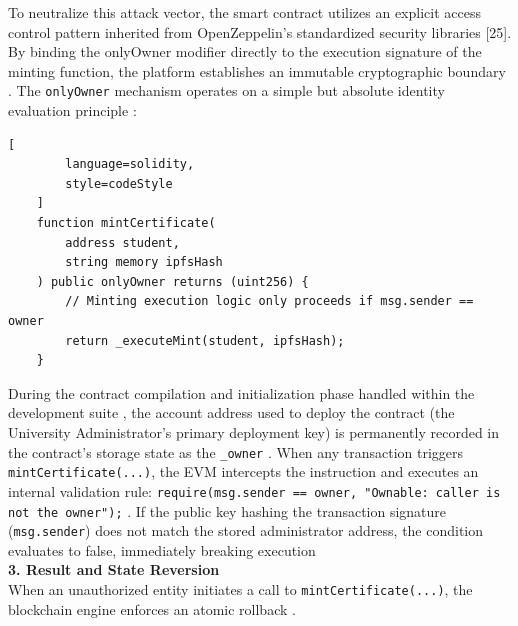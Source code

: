 To neutralize this attack vector, the smart contract utilizes an explicit access control pattern inherited from OpenZeppelin's standardized security libraries [25]. By binding the onlyOwner modifier directly to the execution signature of the minting function, the platform establishes an immutable cryptographic boundary \cite{openzeppelin2026erc721}. The \texttt{onlyOwner} mechanism operates on a simple but absolute identity evaluation principle \cite{openzeppelin2026erc721}:

\begin{lstlisting}[
        language=solidity,
        style=codeStyle
    ]
    function mintCertificate(
        address student,
        string memory ipfsHash
    ) public onlyOwner returns (uint256) {
        // Minting execution logic only proceeds if msg.sender == owner
        return _executeMint(student, ipfsHash);
    }
\end{lstlisting}

During the contract compilation and initialization phase handled within the development suite \cite{hardhat2026ethereum}, the account address used to deploy the contract (the University Administrator's primary deployment key) is permanently recorded in the contract’s storage state as the \texttt{\_owner} \cite{onlinev0835web}. When any transaction triggers \texttt{mintCertificate(...)}, the EVM intercepts the instruction and executes an internal validation rule: \texttt{require(msg.sender == owner, "Ownable: caller is not the owner");} \cite{openzeppelin2026erc721}\cite{william2018eip721}. If the public key hashing the transaction signature (\texttt{msg.sender}) does not match the stored administrator address, the condition evaluates to false, immediately breaking execution \cite{perez2020smartcontracts}\cite{onlinev0835web}\\

\textbf{3. Result and State Reversion}\\

When an unauthorized entity initiates a call to \texttt{mintCertificate(...)}, the blockchain engine enforces an atomic rollback \cite{wood2008EthereumYellowPaper}.

